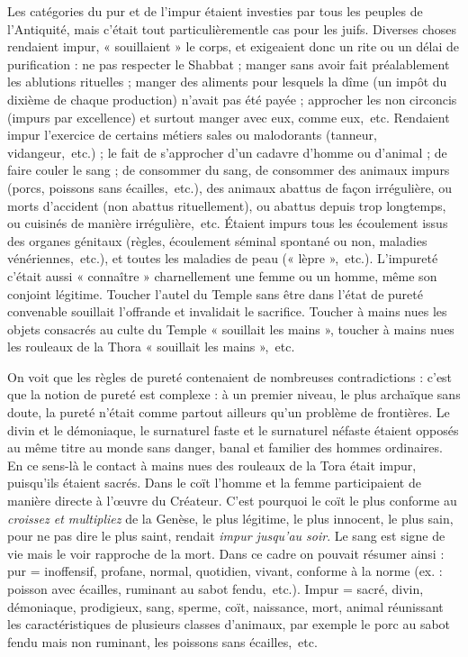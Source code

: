  Les catégories du pur et de l'impur étaient investies par tous les peuples de l'Antiquité, mais c'était tout particulièrementle cas pour les juifs. Diverses choses rendaient impur, « souillaient » le corps, et exigeaient donc un rite ou un délai de purification : ne pas respecter le Shabbat ; manger sans avoir fait préalablement les ablutions rituelles ; manger des aliments pour lesquels la dîme (un impôt du dixième de chaque production) n'avait pas été payée ; approcher les non circoncis (impurs par excellence) et surtout manger avec eux, comme eux,~etc. Rendaient impur l'exercice de certains métiers sales ou malodorants (tanneur, vidangeur,~etc.) ; le fait de s'approcher d'un cadavre d'homme ou d'animal ; de faire couler le sang ; de consommer du sang, de consommer des animaux impurs (porcs, poissons sans écailles,~etc.), des animaux abattus de façon irrégulière, ou morts d'accident (non abattus rituellement), ou abattus depuis trop longtemps, ou cuisinés de manière irrégulière,~etc. Étaient impurs tous les écoulement issus des organes génitaux (règles, écoulement séminal spontané ou non, maladies vénériennes,~etc.), et toutes les maladies de peau (« lèpre »,~etc.). L'impureté c'était aussi « connaître » charnellement une femme ou un homme, même son conjoint légitime. Toucher l'autel du Temple sans être dans l'état de pureté convenable souillait l'offrande et invalidait le sacrifice. Toucher à mains nues les objets consacrés au culte du Temple « souillait les mains », toucher à mains nues les rouleaux de la Thora « souillait les mains »,~etc.

 

 On voit que les règles de pureté contenaient de nombreuses contradictions : c'est que la notion de pureté est complexe : à un premier niveau, le plus archaïque sans doute, la pureté n'était comme partout ailleurs qu'un problème de frontières. Le divin et le démoniaque, le surnaturel faste et le surnaturel néfaste étaient opposés au même titre au monde sans danger, banal et familier des hommes ordinaires. En ce sens-là le contact à mains nues des rouleaux de la Tora était impur, puisqu'ils étaient sacrés. Dans le coït l'homme et la femme participaient de manière directe à l'œuvre du Créateur. C'est pourquoi le coït le plus conforme au {\emph{croissez et multipliez}} de la Genèse, le plus légitime, le plus innocent, le plus sain, pour ne pas dire le plus saint, rendait \emph{impur jusqu'au soir}. Le sang est signe de vie mais le voir rapproche de la mort. Dans ce cadre on pouvait résumer ainsi : pur = inoffensif, profane, normal, quotidien, vivant, conforme à la norme (ex. : poisson avec écailles, ruminant au sabot fendu,~etc.). Impur = sacré, divin, démoniaque, prodigieux, sang, sperme, coït, naissance, mort, animal réunissant les caractéristiques de plusieurs classes d'animaux, par exemple le porc au sabot fendu mais non ruminant, les poissons sans écailles,~etc. 


